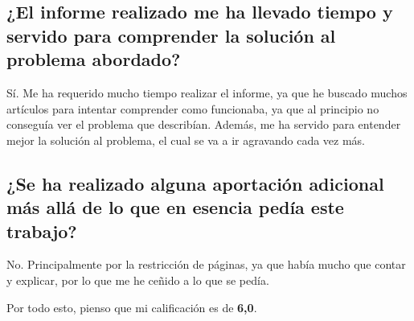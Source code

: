 \documentclass[runningheads]{llncs}
\begin{document}
\subsection{¿El informe realizado me ha llevado tiempo y servido para comprender la solución al problema abordado?}
Sí. Me ha requerido mucho tiempo realizar el informe, ya que he buscado muchos artículos para intentar comprender como funcionaba, ya que al principio no conseguía ver el problema que describían. Además, me ha servido para entender mejor la solución al problema, el cual se va a ir agravando cada vez más.

\subsection{¿Se ha realizado alguna aportación adicional más allá de lo que en esencia pedía este trabajo?}
No. Principalmente por la restricción de páginas, ya que había mucho que contar y explicar, por lo que me he ceñido a lo que se pedía.

\bigskip

Por todo esto, pienso que mi calificación es de \textbf{6,0}.
\end{document}
